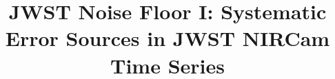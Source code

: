 \documentclass[]{aastex62}
\begin{document}
\title{JWST Noise Floor I: Systematic Error Sources in JWST NIRCam Time Series}


\end{document}

